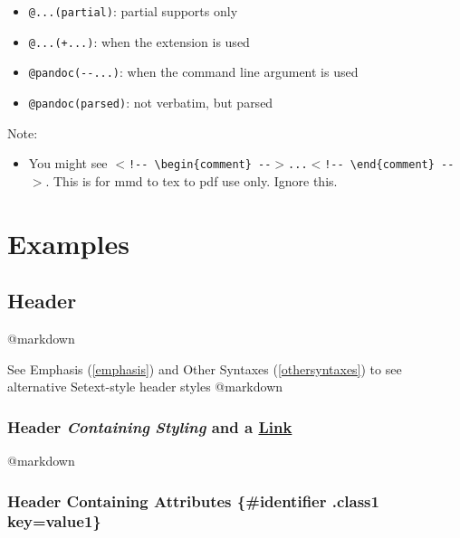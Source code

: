 \begin{itemize}
\begin{itemize}
\item \texttt{@...(partial)}: partial supports only

\item \texttt{@...(+...)}: when the extension is used

\item \texttt{@pandoc(-{}-...)}: when the command line argument is used

\item \texttt{@pandoc(parsed)}: not verbatim, but parsed

\end{itemize}

\end{itemize}

Note:

\begin{itemize}
\item You might see \texttt{$<$!-{}- \textbackslash{}begin\{comment\} -{}-$>$...$<$!-{}- \textbackslash{}end\{comment\} -{}-$>$}. This is for mmd to tex to pdf use only. Ignore this.

\end{itemize}

\chapter{Examples}
\label{examples}

\section{Header}
\label{header}

@markdown

See Emphasis (\autoref{emphasis}) and Other Syntaxes (\autoref{othersyntaxes}) to see alternative Setext-style header styles @markdown

\subsection{Header \emph{Containing} \textbf{\emph{Styling}} and a \href{Https://www.wikipedia.org/}{Link}}
\label{headercontainingstylingandalink}

@markdown

\subsection{Header Containing Attributes \{\#identifier .class1 key=value1\}}
\label{headercontainingattributesidentifier.class1keyvalue1}


